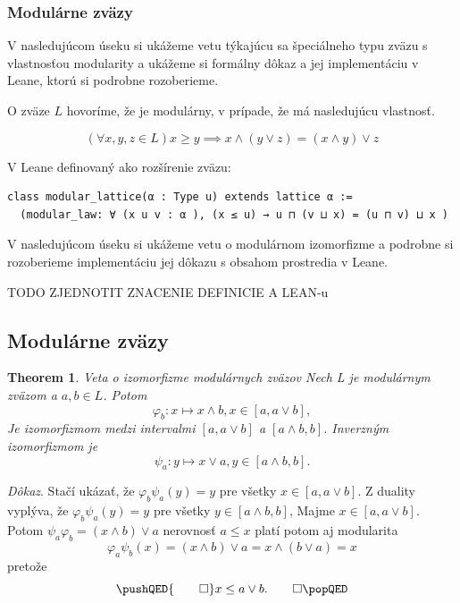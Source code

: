 \documentclass[a4paper,10pt,oneside]{report}%
\newtheorem{theorem}{Theorem}
\begin{document}
\subsubsection{Modulárne zväzy}

V nasledujúcom úseku si ukážeme vetu týkajúcu sa špeciálneho typu zväzu s vlastnosťou
    modularity a ukážeme si formálny dôkaz a jej implementáciu v Leane, ktorú si
    podrobne rozoberieme.

O zväze $L$ hovoríme, že je modulárny, v prípade, že má nasledujúcu vlastnosť.

\begin{equation*}
    (\forall x,y,z \in L) x \geq y \implies x \wedge ( y \vee z) = (x \wedge y) \vee z
\end{equation*}

V Leane definovaný ako rozšírenie zväzu:

\begin{lstlisting}
class modular_lattice(α : Type u) extends lattice α :=
  (modular_law: ∀ (x u v : α ), (x ≤ u) → u ⊓ (v ⊔ x) = (u ⊓ v) ⊔ x )
\end{lstlisting}

V nasledujúcom úseku si ukážeme vetu o modulárnom izomorfizme a podrobne
    si rozoberieme implementáciu jej dôkazu s obsahom prostredia v Leane.

TODO ZJEDNOTIT ZNACENIE DEFINICIE A LEAN-u
\subsection{Modulárne zväzy}
    \begin{theorem} \emph{Veta o izomorfizme modulárnych zväzov}
    Nech L je modulárnym zväzom a $a, b \in L$. Potom
        \begin{equation}
            \varphi_{b}: x \mapsto x \wedge b, x \in [a, a \vee b],
        \end{equation}
    Je izomorfizmom medzi intervalmi $[a, a \vee b]$ a $[ a \wedge b, b]$.
    Inverzným izomorfizmom je
        \begin{equation}
            \psi_{a}: y \mapsto x \vee a, y \in [a \wedge b, b].
        \end{equation}
    \end{theorem}
    \emph{Dôkaz}.  Stačí ukázať, že $\varphi_{b}\psi_{a}(y) = y$ pre všetky $x \in [a, a \vee b]$.
    Z duality vyplýva, že $\varphi_{b}\psi_{a}(y) = y$ pre všetky
        $y \in [a \wedge b, b]$,
    Majme $x \in [a, a \vee b]$. Potom
        $\psi_{a}\varphi_{b} = ( x \wedge b ) \vee a$ nerovnosť $a \leq x$ platí
        potom aj modularita
        \begin{equation}
            \varphi_{a}\psi_{b}(x) =
            ( x \wedge b ) \vee a =
            x \wedge ( b \vee a) =
            x
        \end{equation}
        pretože
        \[
            \pushQED{\qed}
            x \leq a \vee b. \qedhere
            \popQED
        \]
\end{document}
